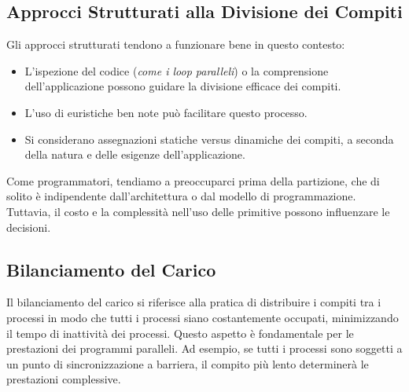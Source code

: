 \subsection{Approcci Strutturati alla Divisione dei
Compiti}
Gli approcci strutturati tendono a funzionare bene in
questo contesto:
\begin{itemize}
    \item L'ispezione del codice (\textit{come i loop
    paralleli}) o la comprensione dell'applicazione
    possono guidare la divisione efficace dei compiti.
    \item L'uso di euristiche ben note può facilitare
    questo processo.
    \item Si considerano assegnazioni statiche versus
    dinamiche dei compiti, a seconda della natura e
    delle esigenze dell'applicazione.
\end{itemize}

Come programmatori, tendiamo a preoccuparci prima della partizione, che di solito è indipendente dall'architettura o dal modello di programmazione. Tuttavia, il costo e la complessità nell'uso delle primitive possono influenzare le decisioni.

\subsection{Bilanciamento del Carico}

Il bilanciamento del carico si riferisce alla pratica
di distribuire i compiti tra i processi in modo che tutti
i processi siano costantemente occupati, minimizzando
il tempo di inattività dei processi. Questo aspetto è
fondamentale per le prestazioni dei programmi paralleli.
Ad esempio, se tutti i processi sono soggetti a un punto
di sincronizzazione a barriera, il compito più lento
determinerà le prestazioni complessive.

